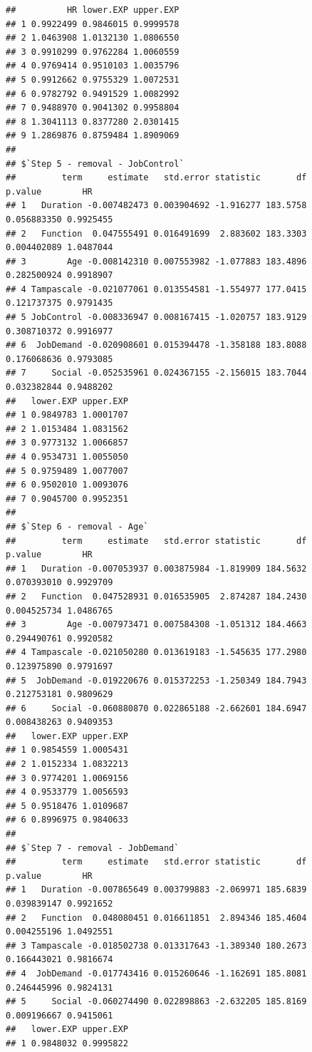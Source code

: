 \documentclass[
]{book}
\begin{document}
\begin{verbatim}
##          HR lower.EXP upper.EXP
## 1 0.9922499 0.9846015 0.9999578
## 2 1.0463908 1.0132130 1.0806550
## 3 0.9910299 0.9762284 1.0060559
## 4 0.9769414 0.9510103 1.0035796
## 5 0.9912662 0.9755329 1.0072531
## 6 0.9782792 0.9491529 1.0082992
## 7 0.9488970 0.9041302 0.9958804
## 8 1.3041113 0.8377280 2.0301415
## 9 1.2869876 0.8759484 1.8909069
## 
## $`Step 5 - removal - JobControl`
##         term     estimate   std.error statistic       df     p.value        HR
## 1   Duration -0.007482473 0.003904692 -1.916277 183.5758 0.056883350 0.9925455
## 2   Function  0.047555491 0.016491699  2.883602 183.3303 0.004402089 1.0487044
## 3        Age -0.008142310 0.007553982 -1.077883 183.4896 0.282500924 0.9918907
## 4 Tampascale -0.021077061 0.013554581 -1.554977 177.0415 0.121737375 0.9791435
## 5 JobControl -0.008336947 0.008167415 -1.020757 183.9129 0.308710372 0.9916977
## 6  JobDemand -0.020908601 0.015394478 -1.358188 183.8088 0.176068636 0.9793085
## 7     Social -0.052535961 0.024367155 -2.156015 183.7044 0.032382844 0.9488202
##   lower.EXP upper.EXP
## 1 0.9849783 1.0001707
## 2 1.0153484 1.0831562
## 3 0.9773132 1.0066857
## 4 0.9534731 1.0055050
## 5 0.9759489 1.0077007
## 6 0.9502010 1.0093076
## 7 0.9045700 0.9952351
## 
## $`Step 6 - removal - Age`
##         term     estimate   std.error statistic       df     p.value        HR
## 1   Duration -0.007053937 0.003875984 -1.819909 184.5632 0.070393010 0.9929709
## 2   Function  0.047528931 0.016535905  2.874287 184.2430 0.004525734 1.0486765
## 3        Age -0.007973471 0.007584308 -1.051312 184.4663 0.294490761 0.9920582
## 4 Tampascale -0.021050280 0.013619183 -1.545635 177.2980 0.123975890 0.9791697
## 5  JobDemand -0.019220676 0.015372253 -1.250349 184.7943 0.212753181 0.9809629
## 6     Social -0.060880870 0.022865188 -2.662601 184.6947 0.008438263 0.9409353
##   lower.EXP upper.EXP
## 1 0.9854559 1.0005431
## 2 1.0152334 1.0832213
## 3 0.9774201 1.0069156
## 4 0.9533779 1.0056593
## 5 0.9518476 1.0109687
## 6 0.8996975 0.9840633
## 
## $`Step 7 - removal - JobDemand`
##         term     estimate   std.error statistic       df     p.value        HR
## 1   Duration -0.007865649 0.003799883 -2.069971 185.6839 0.039839147 0.9921652
## 2   Function  0.048080451 0.016611851  2.894346 185.4604 0.004255196 1.0492551
## 3 Tampascale -0.018502738 0.013317643 -1.389340 180.2673 0.166443021 0.9816674
## 4  JobDemand -0.017743416 0.015260646 -1.162691 185.8081 0.246445996 0.9824131
## 5     Social -0.060274490 0.022898863 -2.632205 185.8169 0.009196667 0.9415061
##   lower.EXP upper.EXP
## 1 0.9848032 0.9995822

\end{verbatim}
\end{document}
